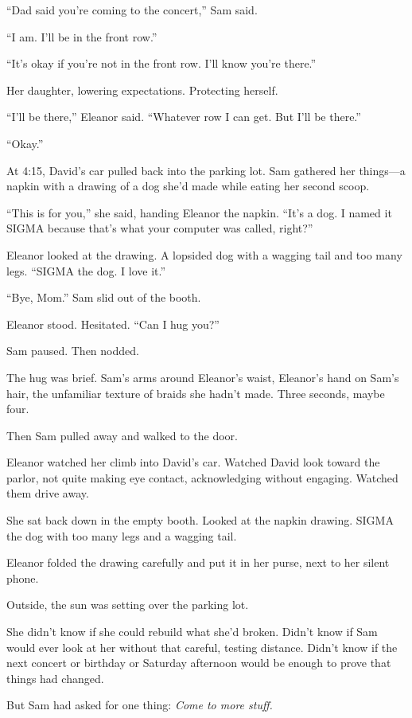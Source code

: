 ``Dad said you're coming to the concert,'' Sam said.

``I am. I'll be in the front row.''

``It's okay if you're not in the front row. I'll know you're there.''

Her daughter, lowering expectations. Protecting herself.

``I'll be there,'' Eleanor said. ``Whatever row I can get. But I'll be there.''

``Okay.''

At 4:15, David's car pulled back into the parking lot. Sam gathered her things---a napkin with a drawing of a dog she'd made while eating her second scoop.

``This is for you,'' she said, handing Eleanor the napkin. ``It's a dog. I named it SIGMA because that's what your computer was called, right?''

Eleanor looked at the drawing. A lopsided dog with a wagging tail and too many legs. ``SIGMA the dog. I love it.''

``Bye, Mom.'' Sam slid out of the booth.

Eleanor stood. Hesitated. ``Can I hug you?''

Sam paused. Then nodded.

The hug was brief. Sam's arms around Eleanor's waist, Eleanor's hand on Sam's hair, the unfamiliar texture of braids she hadn't made. Three seconds, maybe four.

Then Sam pulled away and walked to the door.

Eleanor watched her climb into David's car. Watched David look toward the parlor, not quite making eye contact, acknowledging without engaging. Watched them drive away.

She sat back down in the empty booth. Looked at the napkin drawing. SIGMA the dog with too many legs and a wagging tail.

Eleanor folded the drawing carefully and put it in her purse, next to her silent phone.

Outside, the sun was setting over the parking lot.

She didn't know if she could rebuild what she'd broken. Didn't know if Sam would ever look at her without that careful, testing distance. Didn't know if the next concert or birthday or Saturday afternoon would be enough to prove that things had changed.

But Sam had asked for one thing: \emph{Come to more stuff.}

